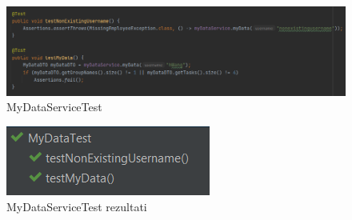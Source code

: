				
				
				\begin{figure}[H] 					\centering 				\includegraphics[width=\textwidth]{Dokumentacija/ispit-komp/MyDataServiceTest.png}
				\caption{MyDataServiceTest}
				\end{figure}
                \begin{figure}[H] 					\centering 					                    \includegraphics[width=\textwidth]{Dokumentacija/ispit-komp/MyDataServiceTest - rezultati.png}
				\caption{MyDataServiceTest rezultati}
				\end{figure}
				
